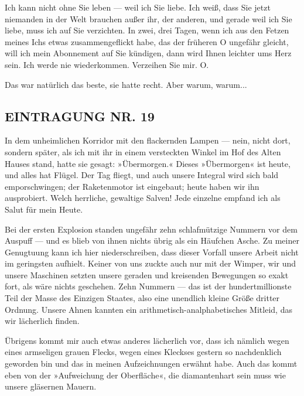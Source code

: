 Ich kann nicht ohne Sie leben — weil ich Sie liebe. Ich weiß, dass
Sie jetzt niemanden in der Welt brauchen außer ihr, der anderen,
und gerade weil ich Sie liebe, muss ich auf Sie verzichten. In
zwei, drei Tagen, wenn ich aus den Fetzen meines Ichs etwas
zusammengeflickt habe, das der früheren O ungefähr gleicht, will
ich mein Abonnement auf Sie kündigen, dann wird Ihnen leichter ums
Herz sein. Ich werde nie wiederkommen. Verzeihen Sie mir. O.

Das war natürlich das beste, sie hatte recht. Aber warum, warum...

\subsection{EINTRAGUNG NR. 19}

In dem unheimlichen Korridor mit den flackernden Lampen — nein,
nicht dort, sondern später, als ich mit ihr in einem versteckten
Winkel im Hof des Alten Hauses stand, hatte sie gesagt:
»Übermorgen.« Dieses »Übermorgen« ist heute, und alles hat Flügel.
Der Tag fliegt, und auch unsere Integral wird sich bald
emporschwingen; der Raketenmotor ist eingebaut; heute haben wir ihn
ausprobiert. Welch herrliche, gewaltige Salven! Jede einzelne
empfand ich als Salut für mein Heute.

Bei der ersten Explosion standen ungefähr zehn schlafmützige
Nummern vor dem Auspuff — und es blieb von ihnen nichts übrig als
ein Häufchen Asche. Zu meiner Genugtuung kann ich hier
niederschreiben, dass dieser Vorfall unsere Arbeit nicht im
geringsten aufhielt. Keiner von uns zuckte auch nur mit der Wimper,
wir und unsere Maschinen setzten unsere geraden und kreisenden
Bewegungen so exakt fort, als wäre nichts geschehen. Zehn Nummern —
das ist der hundertmillionste Teil der Masse des Einzigen Staates,
also eine unendlich kleine Größe dritter Ordnung. Unsere Ahnen
kannten ein arithmetisch-analphabetisches Mitleid, das wir
lächerlich finden.

Übrigens kommt mir auch etwas anderes lächerlich vor, dass ich
nämlich wegen eines armseligen grauen Flecks, wegen eines Kleckses
gestern so nachdenklich geworden bin und das in meinen
Aufzeichnungen erwähnt habe. Auch das kommt eben von der
»Aufweichung der Oberfläche«, die diamantenhart sein muss wie
unsere gläsernen Mauern.

